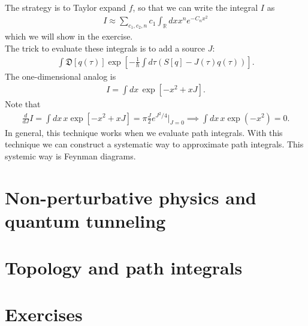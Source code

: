 \documentclass{book}
\theoremstyle{definition}
\newcommand{\R}{\mathbb{R}}
\newcommand{\f}[2]{\frac{#1}{#2}}
\newcommand{\lp}{\left(}
\newcommand{\rp}{\right)}
\newcommand{\lb}{\left[}
\newcommand{\rb}{\right]}
\begin{document}
The strategy is to Taylor expand $f$, so that we can write the integral $I$ as
\begin{align}
I \approx \sum_{c_1,c_2,n}c_1 \int_\R dx x^n e^{-C_n x^2}
\end{align}
which we will show in the exercise. \\

The trick to evaluate these integrals is to add a source $J$:
\begin{align}
\int \mathfrak{D}[q(\tau)] \exp\lb -\f{1}{\hbar} \int d\tau \lp S[q] - J(\tau)q(\tau)\rp \rb.
\end{align}
The one-dimensional analog is 
\begin{align}
I = \int dx \,\exp\lb -x^2 + xJ \rb.
\end{align}
Note that
\begin{align}
\f{d}{dJ}I = \int dx\, x \exp\lb -x^2 + xJ \rb = \pi \f{J}{2}e^{J^2/4}\bigg\vert_{J=0} \implies \int dx\, x\exp(-x^2) = 0.
\end{align}
In general, this technique works when we evaluate path integrals. With this technique we can construct a systematic way to approximate path integrals. This systemic way is Feynman diagrams. 





\newpage

\section{Non-perturbative physics and quantum tunneling}


\newpage


\section{Topology and path integrals}


\newpage




\section{Exercises}
\end{document}
